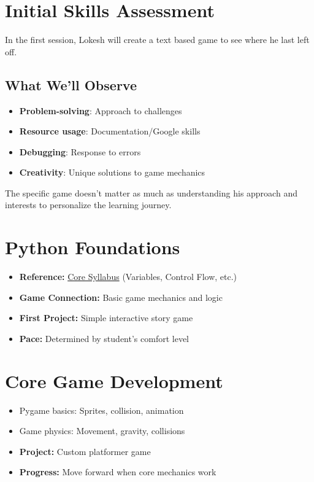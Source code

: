 \documentclass{article}
\begin{document}
\section{Initial Skills Assessment}
In the first session, Lokesh will create a text based game to see where he last left off.

\subsection*{What We'll Observe}
\begin{itemize}
\item \textbf{Problem-solving}: Approach to challenges
\item \textbf{Resource usage}: Documentation/Google skills
\item \textbf{Debugging}: Response to errors
\item \textbf{Creativity}: Unique solutions to game mechanics
\end{itemize}

The specific game doesn't matter as much as understanding his approach and interests to personalize the learning journey.

\section{Python Foundations}
\begin{itemize}[nosep]
    \item \textbf{Reference:} \href{https://codeabode.co/Syllabus.pdf}{Core Syllabus} (Variables, Control Flow, etc.)
    \item \textbf{Game Connection:} Basic game mechanics and logic
    \item \textbf{First Project:} Simple interactive story game
    \item \textbf{Pace:} Determined by student's comfort level
\end{itemize}

\section{Core Game Development}
\begin{itemize}[nosep]
    \item Pygame basics: Sprites, collision, animation
    \item Game physics: Movement, gravity, collisions
    \item \textbf{Project:} Custom platformer game
    \item \textbf{Progress:} Move forward when core mechanics work
\end{itemize}
\end{document}
